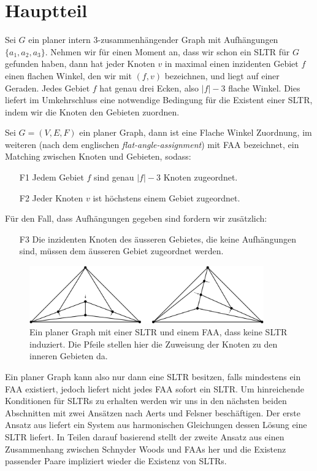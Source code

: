 \chapter{Hauptteil}

Sei $G$ ein planer intern 3-zusammenhängender Graph mit Aufhängungen $\{a_1,a_2,a_3\}$. Nehmen wir für einen Moment an, dass wir schon ein SLTR für $G$ gefunden haben, dann hat jeder Knoten $v$ in maximal einen inzidenten Gebiet $f$ einen flachen Winkel, den wir mit $(f,v)$ bezeichnen, und liegt auf einer Geraden. Jedes Gebiet $f$ hat genau drei Ecken, also $|f|-3$ flache Winkel. Dies liefert im Umkehrschluss eine notwendige Bedingung für die Existent einer SLTR, indem wir die Knoten den Gebieten zuordnen.

\begin{definition}[FAA]
Sei $G=(V,E,F)$ ein planer Graph, dann ist eine Flache Winkel Zuordnung, im weiteren (nach dem englischen \textit{flat-angle-assignment}) mit FAA bezeichnet, ein Matching zwischen Knoten und Gebieten, sodass:
\begin{itemize}
\item [F1] Jedem Gebiet $f$ sind genau $|f|-3$ Knoten zugeordnet.
\item [F2] Jeder Knoten $v$ ist höchstens einem Gebiet zugeordnet.
\end{itemize}
Für den Fall, dass Aufhängungen gegeben sind fordern wir zusätzlich:
\begin{itemize}
\item [F3] Die inzidenten Knoten des äusseren Gebietes, die keine Aufhängungen sind, müssen dem äusseren Gebiet zugeordnet werden.
\end{itemize}

\begin{figure}[h]
	\centering
  \includegraphics[width=0.9\textwidth]{faa_def.png}
  \caption{Ein planer Graph mit einer SLTR und einem FAA, dass keine SLTR induziert. Die Pfeile stellen hier die Zuweisung der Knoten zu den inneren Gebieten da.}
\end{figure}

\end{definition}

Ein planer Graph kann also nur dann eine SLTR besitzen, falls mindestens ein FAA existiert, jedoch liefert nicht jedes FAA sofort ein SLTR. Um hinreichende Konditionen für SLTRs zu erhalten werden wir uns in den nächsten beiden Abschnitten mit zwei Ansätzen nach Aerts und Felsner beschäftigen. Der erste Ansatz aus \cite{af13} liefert ein System aus harmonischen Gleichungen dessen Lösung eine SLTR liefert. In Teilen darauf basierend stellt der zweite Ansatz aus \cite{af15} einen Zusammenhang zwischen Schnyder Woods und FAAs her und die Existenz passender Paare impliziert wieder die Existenz von SLTRs.



